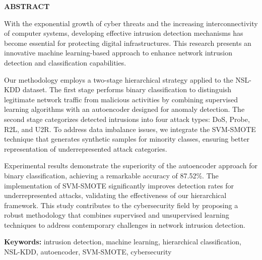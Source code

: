 \newpage
\thispagestyle{empty}

\begin{center}
    \vspace{2cm}
    {\Large \textbf{\color{blueuniv}ABSTRACT}}
    \vspace{1cm}
\end{center}

\noindent
With the exponential growth of cyber threats and the increasing interconnectivity of computer systems, developing effective intrusion detection mechanisms has become essential for protecting digital infrastructures. This research presents an innovative machine learning-based approach to enhance network intrusion detection and classification capabilities.

\vspace{0.5cm}

\noindent
Our methodology employs a two-stage hierarchical strategy applied to the NSL-KDD dataset. The first stage performs binary classification to distinguish legitimate network traffic from malicious activities by combining supervised learning algorithms with an autoencoder designed for anomaly detection. The second stage categorizes detected intrusions into four attack types: DoS, Probe, R2L, and U2R. To address data imbalance issues, we integrate the SVM-SMOTE technique that generates synthetic samples for minority classes, ensuring better representation of underrepresented attack categories.

\vspace{0.5cm}

\noindent
Experimental results demonstrate the superiority of the autoencoder approach for binary classification, achieving a remarkable accuracy of 87.52\%. The implementation of SVM-SMOTE significantly improves detection rates for underrepresented attacks, validating the effectiveness of our hierarchical framework. This study contributes to the cybersecurity field by proposing a robust methodology that combines supervised and unsupervised learning techniques to address contemporary challenges in network intrusion detection.

\vspace{1cm}

\noindent
\textbf{Keywords:} intrusion detection, machine learning, hierarchical classification, NSL-KDD, autoencoder, SVM-SMOTE, cybersecurity

\newpage